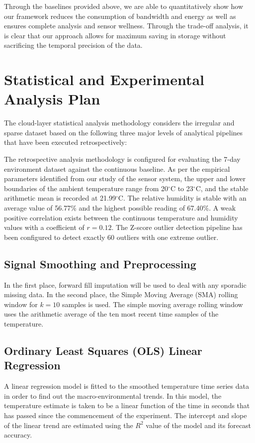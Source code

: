 Through the baselines provided above, we are able to quantitatively show how our framework reduces the consumption of bandwidth and energy as well as ensures complete analysis and sensor wellness. Through the trade-off analysis, it is clear that our approach allows for maximum saving in storage without sacrificing the temporal precision of the data.

\section{Statistical and Experimental Analysis Plan}
\label{sec:analysis}
The cloud-layer statistical analysis methodology considers the irregular and sparse dataset based on the following three major levels of analytical pipelines that have been executed retrospectively:

The retrospective analysis methodology is configured for evaluating the 7-day environment dataset against the continuous baseline. As per the empirical parameters identified from our study of the sensor system, the upper and lower boundaries of the ambient temperature range from 20$^\circ$C to 23$^\circ$C, and the stable arithmetic mean is recorded at 21.99$^\circ$C. The relative humidity is stable with an average value of 56.77\% and the highest possible reading of 67.40\%. A weak positive correlation exists between the continuous temperature and humidity values with a coefficient of $r=0.12$. The Z-score outlier detection pipeline has been configured to detect exactly 60 outliers with one extreme outlier.

\subsection{Signal Smoothing and Preprocessing}
In the first place, forward fill imputation will be used to deal with any sporadic missing data. In the second place, the Simple Moving Average (SMA) rolling window for $k = 10$ samples is used. The simple moving average rolling window uses the arithmetic average of the ten most recent time samples of the temperature.

\subsection{Ordinary Least Squares (OLS) Linear Regression}
A linear regression model is fitted to the smoothed temperature time series data in order to find out the macro-environmental trends. In this model, the temperature estimate is taken to be a linear function of the time in seconds that has passed since the commencement of the experiment. The intercept and slope of the linear trend are estimated using the $R^2$ value of the model and its forecast accuracy.

